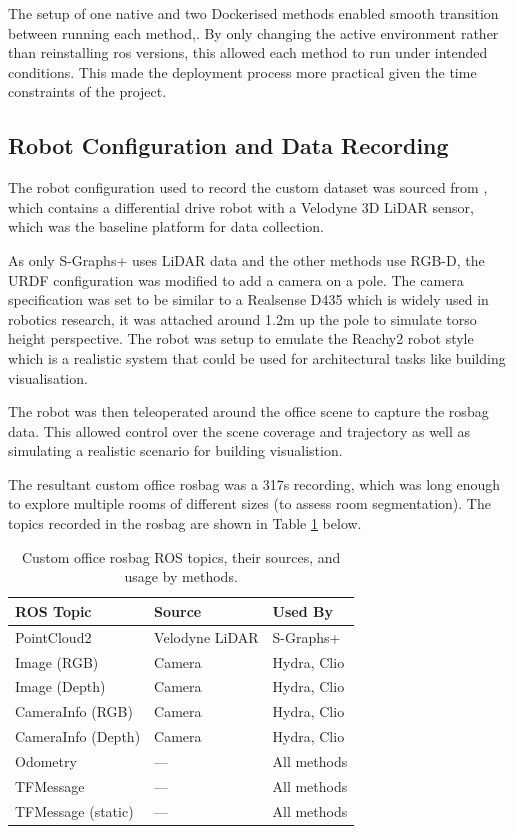 The setup of one native and two Dockerised methods enabled smooth transition between running each method,. By only changing the active environment rather than reinstalling \acrshort{ros} versions, this allowed each method to run under intended conditions. This made the deployment process more practical given the time constraints of the project.

\subsection{Robot Configuration and Data Recording}\label{sec:sim-robot-config}

The robot configuration used to record the custom dataset was sourced from \cite{mobile-3d-lidar-sim}, which contains a differential drive robot with a Velodyne 3D LiDAR sensor, which was the baseline platform for data collection. 

As only S-Graphs+ uses LiDAR data and the other methods use RGB-D, the URDF configuration was modified to add a camera on a pole. The camera specification was set to be similar to a Realsense D435 which is widely used in robotics research, it was attached around 1.2m up the pole to simulate torso height perspective. The robot was setup to emulate the Reachy2 robot \cite{Reachy2} style which is a realistic system that could be used for architectural tasks like building visualisation.

The robot was then teleoperated around the office scene to capture the rosbag data. This allowed control over the scene coverage and trajectory as well as simulating a realistic scenario for building visualistion.

The resultant custom office rosbag was a 317s recording, which was long enough to explore multiple rooms of different sizes (to assess room segmentation). The topics recorded in the rosbag are shown in Table \ref{tab:rosbag-topics} below.

\begin{table}[H]
\centering
\caption{Custom office rosbag ROS topics, their sources, and usage by methods.}
\label{tab:rosbag-topics}
\begin{tabular}{lll}
\toprule
\textbf{ROS Topic} & \textbf{Source} & \textbf{Used By} \\
\midrule
PointCloud2         & Velodyne LiDAR & S-Graphs+ \\
Image (RGB)         & Camera         & Hydra, Clio \\
Image (Depth)       & Camera         & Hydra, Clio \\
CameraInfo (RGB)    & Camera         & Hydra, Clio \\
CameraInfo (Depth)  & Camera         & Hydra, Clio \\
Odometry            & ---              & All methods \\
TFMessage           & ---              & All methods \\
TFMessage (static)  & ---              & All methods \\
\bottomrule
\end{tabular}
\end{table}

